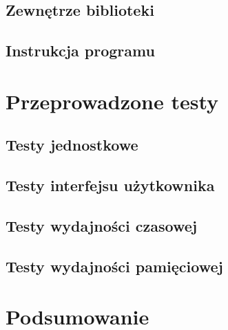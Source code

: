 \documentclass[twoside,a4paper]{book}
\begin{document}
\section{Zewnętrze biblioteki}
\section{Instrukcja programu}

\chapter{Przeprowadzone testy}
\section{Testy jednostkowe}
\section{Testy interfejsu użytkownika}
\section{Testy wydajności czasowej}
\section{Testy wydajności pamięciowej}
\chapter{Podsumowanie}


\backmatter



\nocite{barbeau2003polynomials}
\nocite{buell2004algorithmic}
\nocite{burden2015numerical}
\nocite{childs2012concrete}
\nocite{granlund2015gnu}
\nocite{kryszewski2014wyklad}
\nocite{malik2009data}
\nocite{mcnamee2007numerical}
\nocite{mora2003solving}
\nocite{pan2012structured}
\nocite{polskie1968wiadomosci}
\nocite{sierpinski1951zasady}
\nocite{Warmus_Mieczyslaw_(1918-2007)_Metody}

\end{document}
